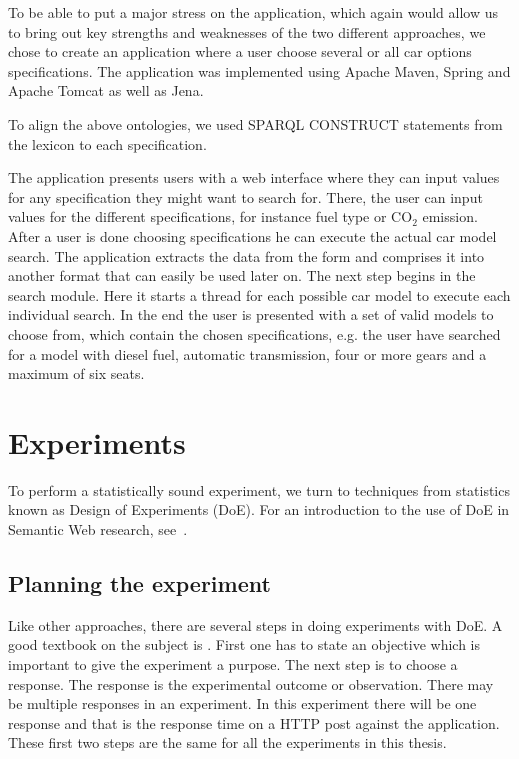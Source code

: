 \documentclass{llncs}
\begin{document}
To be able to put a major stress on the application, which again would
allow us to bring out key strengths and weaknesses of the two
different approaches, we chose to create an application where a user
choose several or all car options specifications. The application was
implemented using Apache Maven, Spring and Apache Tomcat as well as
Jena.

To align the above ontologies, we used SPARQL CONSTRUCT statements
from the lexicon to each specification.

The application presents users with a web interface where they can
input values for any specification they might want to search
for. There, the user can input values for the different specifications,
for instance fuel type or CO$_2$ emission. After a user is done
choosing specifications he can execute the actual car model
search. The application extracts the data from the form and comprises
it into another format that can easily be used later on. The next step
begins in the search module. Here it starts a thread for each possible
car model to execute each individual search. In the end the user is
presented with a set of valid models to choose from, which contain the
chosen specifications, e.g. the user have searched for a model with
diesel fuel, automatic transmission, four or more gears and a maximum
of six seats.


\section{Experiments}\label{Results}

To perform a statistically sound experiment, we turn to techniques
from statistics known as Design of Experiments (DoE). For an
introduction to the use of DoE in Semantic Web research, see~\cite{Kjern}.

\subsection{Planning the experiment}
Like other approaches, there are several steps in doing experiments
with DoE. A good textbook on the subject is \cite{PlanExp}. First one
has to state an objective which is important to give the experiment a
purpose.  The next step is to choose a response. The response is the
experimental outcome or observation. There may be multiple responses
in an experiment. In this experiment there will be one response and
that is the response time on a HTTP post against the application.
These first two steps are the same for all the experiments in this
thesis.
\end{document}

